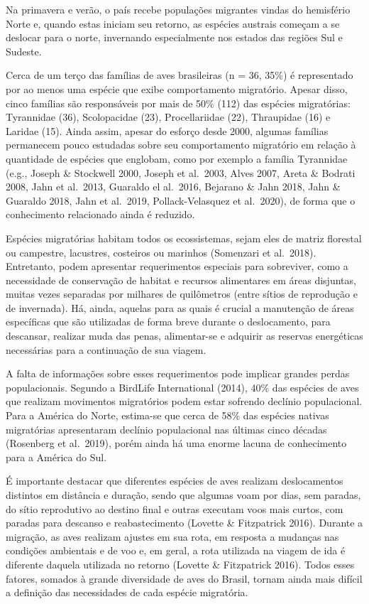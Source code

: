 \documentclass[
  oneside]{scrbook}
\begin{document}
Na primavera e verão, o país recebe populações migrantes vindas do hemisfério Norte e, quando estas iniciam seu retorno, as espécies austrais começam a se deslocar para o norte, invernando especialmente nos estados das regiões Sul e Sudeste.

Cerca de um terço das famílias de aves brasileiras (n = 36, 35\%) é representado por ao menos uma espécie que exibe comportamento migratório. Apesar disso, cinco famílias são responsáveis por mais de 50\% (112) das espécies migratórias: Tyrannidae (36), Scolopacidae (23), Procellariidae (22), Thraupidae (16) e Laridae (15). Ainda assim, apesar do esforço desde 2000, algumas famílias permanecem pouco estudadas sobre seu comportamento migratório em relação à quantidade de espécies que englobam, como por exemplo a família Tyrannidae (e.g., Joseph \& Stockwell 2000, Joseph et al.~2003, Alves 2007, Areta \& Bodrati 2008, Jahn et al.~2013, Guaraldo el al.~2016, Bejarano \& Jahn 2018, Jahn \& Guaraldo 2018, Jahn et al.~2019, Pollack-Velasquez et al.~2020), de forma que o conhecimento relacionado ainda é reduzido.

Espécies migratórias habitam todos os ecossistemas, sejam eles de matriz florestal ou campestre, lacustres, costeiros ou marinhos (Somenzari et al.~2018). Entretanto, podem apresentar requerimentos especiais para sobreviver, como a necessidade de conservação de habitat e recursos alimentares em áreas disjuntas, muitas vezes separadas por milhares de quilômetros (entre sítios de reprodução e de invernada). Há, ainda, aquelas para as quais é crucial a manutenção de áreas específicas que são utilizadas de forma breve durante o deslocamento, para descansar, realizar muda das penas, alimentar-se e adquirir as reservas energéticas necessárias para a continuação de sua viagem.

A falta de informações sobre esses requerimentos pode implicar grandes perdas populacionais. Segundo a BirdLife International (2014), 40\% das espécies de aves que realizam movimentos migratórios podem estar sofrendo declínio populacional. Para a América do Norte, estima-se que cerca de 58\% das espécies nativas migratórias apresentaram declínio populacional nas últimas cinco décadas (Rosenberg et al.~2019), porém ainda há uma enorme lacuna de conhecimento para a América do Sul.

É importante destacar que diferentes espécies de aves realizam deslocamentos distintos em distância e duração, sendo que algumas voam por dias, sem paradas, do sítio reprodutivo ao destino final e outras executam voos mais curtos, com paradas para descanso e reabastecimento (Lovette \& Fitzpatrick 2016). Durante a migração, as aves realizam ajustes em sua rota, em resposta a mudanças nas condições ambientais e de voo e, em geral, a rota utilizada na viagem de ida é diferente daquela utilizada no retorno (Lovette \& Fitzpatrick 2016). Todos esses fatores, somados à grande diversidade de aves do Brasil, tornam ainda mais difícil a definição das necessidades de cada espécie migratória.
\end{document}
